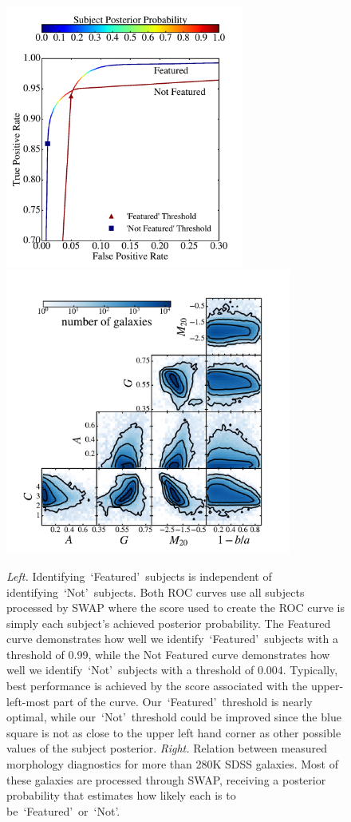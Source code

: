 \documentclass[twocolumn]{aastex6}
\newcommand{\feat}{`Featured'}
\newcommand{\notfeat}{`Not'}
\begin{document}
\begin{figure}[t!]
\includegraphics[width=3.08in]{figures/SWAP_ROC_curve_4paper.pdf}
\includegraphics[width=3.7in]{figures/morph_params_entire_GZ2_sample.pdf}
\caption{\textit{Left.} Identifying~\feat~subjects is independent of identifying~\notfeat~subjects.  Both ROC curves use all subjects processed by SWAP where the score used to create the ROC curve is simply each subject's achieved posterior probability. The Featured curve demonstrates how well we identify~\feat~subjects with a threshold of 0.99, while the Not Featured curve demonstrates how well we identify~\notfeat~subjects with a threshold of 0.004. Typically, best performance is achieved by the score associated with the upper-left-most part of the curve. Our~\feat~threshold is nearly optimal, while our~\notfeat~threshold could be improved since the blue square is not as close to the upper left hand corner as other possible values of the subject posterior. \textit{Right.} Relation between measured morphology diagnostics for more than 280K SDSS galaxies. Most of these galaxies are processed through SWAP, receiving a posterior probability that estimates how likely each is to be~\feat~or~\notfeat.}
\label{fig: morph thresh}
\end{figure}
\end{document}

